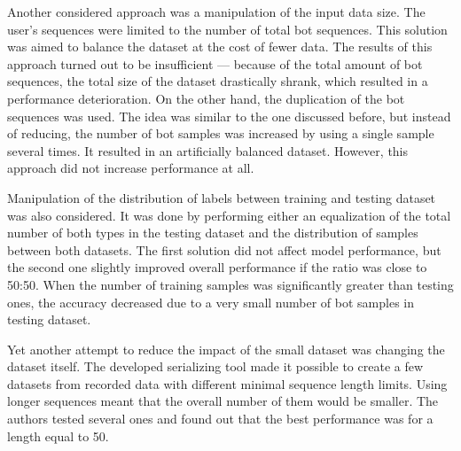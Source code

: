 Another considered approach was a manipulation of the input data size.
The user's sequences were limited to the number of total bot sequences.
This solution was aimed to balance the dataset at the cost of fewer data.
The results of this approach turned out to be insufficient --- because of the total amount of bot sequences, the total size of the dataset drastically shrank, which resulted in a performance deterioration.
On the other hand, the duplication of the bot sequences was used.
The idea was similar to the one discussed before, but instead of reducing, the number of bot samples was increased by using a single sample several times.
It resulted in an artificially balanced dataset.
However, this approach did not increase performance at all.

Manipulation of the distribution of labels between training and testing dataset was also considered.
It was done by performing either an equalization of the total number of both types in the testing dataset and the distribution of samples between both datasets.
The first solution did not affect model performance, but the second one slightly improved overall performance if the ratio was close to 50:50.
When the number of training samples was significantly greater than testing ones, the accuracy decreased due to a very small number of bot samples in testing dataset.

Yet another attempt to reduce the impact of the small dataset was changing the dataset itself.
The developed serializing tool made it possible to create a few datasets from recorded data with different minimal sequence length limits.
Using longer sequences meant that the overall number of them would be smaller.
The authors tested several ones and found out that the best performance was for a length equal to 50.

